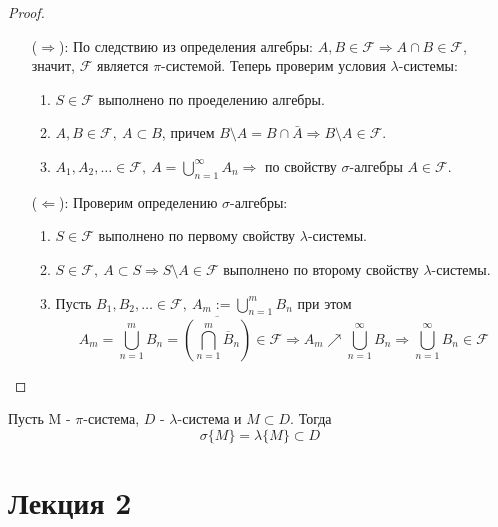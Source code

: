\documentclass[a4paper, 12pt]{article}
\begin{document}
\begin{proof}\tab
    \begin{itemize}
        \item[($\Rightarrow$):] По следствию из определения алгебры: $A,B\in \mathcal{F} \Rightarrow A\cap B\in \mathcal{F}$, значит, $\mathcal{F}$ является $\pi$-системой. Теперь проверим условия $\lambda$-системы:
        \begin{enumerate}
            \item $S\in \mathcal{F}$ выполнено по проеделению алгебры.
            \item $A,B\in \mathcal{F},\ A\subset B$, причем $B\setminus A=B\cap \bar{A} \Rightarrow B\setminus A\in \mathcal{F}$.
            \item $A_1, A_2, \dots\in \mathcal{F},\ A=\bigcup\limits_{n=1}^{\infty}A_n \Rightarrow$ по свойству $\sigma$-алгебры $A\in \mathcal{F}$.
        \end{enumerate}
        \item[($\Leftarrow$):] Проверим определению $\sigma$-алгебры:
        \begin{enumerate}
            \item $S\in \mathcal{F}$ выполнено по первому свойству $\lambda$-системы.
            \item $S\in \mathcal{F},\ A\subset S \Rightarrow S\setminus A\in \mathcal{F}$ выполнено по второму свойству $\lambda$-системы.
            \item Пусть $B_1, B_2,\dots \in \mathcal{F},\ A_m:=\bigcup\limits_{n=1}^m B_n$ при этом
            \[A_m=\bigcup\limits_{n=1}^m B_n=\overline{\left(\bigcap\limits_{n=1}^m \overline{B}_n\right)}\in \mathcal{F} \Rightarrow A_m\nearrow \bigcup\limits_{n=1}^{\infty} B_n \Rightarrow \bigcup\limits_{n=1}^{\infty} B_n\in \mathcal{F}\]
        \end{enumerate}
    \end{itemize}
\end{proof}
\newpage
\begin{theorem}\label{th1}
    Пусть M - $\pi$-система, $D$ - $\lambda$-система и $M\subset D$. Тогда
    \[\sigma\{M\}=\lambda\{M\}\subset D\]
\end{theorem}
\section{Лекция 2}
\end{document}
